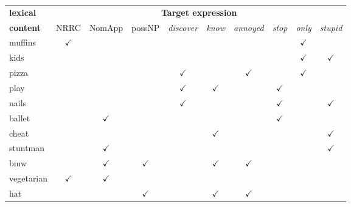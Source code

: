 \documentclass[11pt,fleqn]{article}
\newcommand{\6}{\mbox{$[\hspace*{-.6mm}[$}}
\newcommand{\9}{\mbox{$]\hspace*{-.6mm}]$}}
\begin{document}
\begin{table}[!h]
\begin{center}
\begin{tabular}{l|ccccccccc}
{\bf lexical} & \multicolumn{9}{c}{\bf Target expression} \\ 
 
{\bf content} & NRRC & NomApp & possNP & {\em discover} & {\em know} & {\em annoyed} & {\em stop} & {\em only} & {\em stupid} \\\hline \hline

muffins & $\checkmark$ & & & & & & & $\checkmark$ &  \\

\hline

kids & & & & & & & & $\checkmark$ & $\checkmark$ \\

\hline

pizza & & & & $\checkmark$ & & $\checkmark$ & & $\checkmark$ &  \\

\hline

play & & & & $\checkmark$ & $\checkmark$ & & $\checkmark$ & &  \\

\hline

nails & & & & $\checkmark$ & & & $\checkmark$ & & $\checkmark$  \\

\hline

ballet & & $\checkmark$& & & & & $\checkmark$ & &  \\

\hline

cheat & & & & & $\checkmark$ & & & & $\checkmark$ \\

\hline

stuntman & & $\checkmark$ & & & & & & & $\checkmark$ \\

\hline

bmw & & $\checkmark$ & $\checkmark$ & & $\checkmark$ & $\checkmark$ & & &  \\

\hline

vegetarian & $\checkmark$ & $\checkmark$& & & & & & &  \\

\hline

hat & & & $\checkmark$ & & $\checkmark$ & $\checkmark$ & & &  \\

\hline


\end{tabular}
\end{center}
\end{table}
\end{document}
